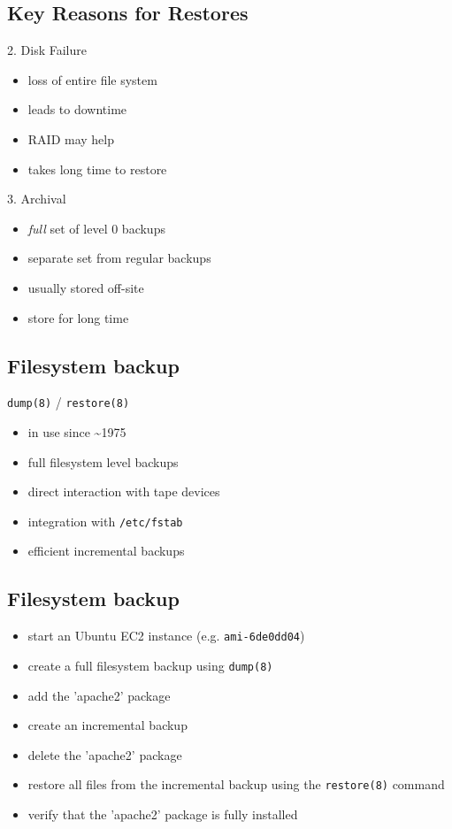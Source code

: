 \documentclass[xga]{xdvislides}
\begin{document}
\subsection{Key Reasons for Restores}
2. Disk Failure
\begin{itemize}
	\item loss of entire file system
	\item leads to downtime
	\item RAID may help
	\item takes long time to restore
\end{itemize}
\addvspace{.5in}
3. Archival
\begin{itemize}
	\item {\em full} set of level 0 backups
	\item separate set from regular backups
	\item usually stored off-site
	\item store for long time
\end{itemize}

\subsection{Filesystem backup}
{\tt dump(8)} / {\tt restore(8)}
\begin{itemize}
	\item in use since \~{}1975
	\item full filesystem level backups
	\item direct interaction with tape devices
	\item integration with {\tt /etc/fstab}
	\item efficient incremental backups
\end{itemize}

\subsection{Filesystem backup}
\begin{itemize}
	\item start an Ubuntu EC2 instance (e.g. \verb+ami-6de0dd04+)
	\item create a full filesystem backup using \verb+dump(8)+
	\item add the 'apache2' package
	\item create an incremental backup
	\item delete the 'apache2' package
	\item restore all files from the incremental backup using the \verb+restore(8)+ command
	\item verify that the 'apache2' package is fully installed
\end{itemize}
\end{document}
